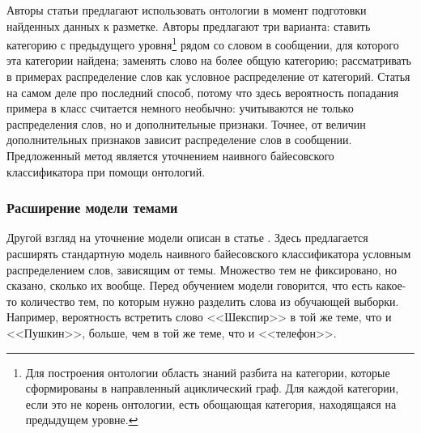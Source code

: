 Авторы статьи \cite{SaifHassanHeYulanAlani2012} предлагают использовать онтологии в момент
подготовки найденных данных к разметке. Авторы предлагают три варианта: ставить
категорию с предыдущего уровня\footnote{Для построения онтологии область знаний разбита на категории, которые сформированы в направленный
  ациклический граф. Для каждой категории, если это не корень онтологии, есть обощающая категория,
  находящаяся на предыдущем уровне.}
рядом со словом в сообщении, для которого эта категории
найдена; заменять слово на более общую категорию; рассматривать в примерах распределение слов как
условное распределение от категорий. Статья на самом деле про последний способ, потому что здесь
вероятность попадания примера в класс считается немного необычно: учитываются не только
распределения слов, но и дополнительные признаки. Точнее, от величин дополнительных признаков
зависит распределение слов в сообщении. Предложенный метод является уточнением наивного байесовского
классификатора при помощи онтологий.

\subsubsection{Расширение модели темами}
Другой взгляд на уточнение модели описан в статье \cite{Celikyilmaz2010}. Здесь предлагается
расширять стандартную модель наивного байесовского классификатора условным распределением слов, зависящим
от темы. Множество тем не фиксировано, но сказано, сколько их вообще. Перед обучением модели
говорится, что есть какое-то количество тем, по которым нужно разделить слова из обучающей выборки. Например,
вероятность встретить слово <<Шекспир>> в той же теме, что и <<Пушкин>>, больше, чем в той же теме,
что и <<телефон>>.
